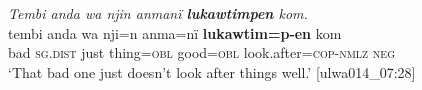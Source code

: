 \ea%
    \label{ex:loss:30}
          \textit{Tembi anda wa njin anmanï \textbf{lukawtimpen} kom.}\\
\gll    tembi  anda    wa    nji=n    anma=nï  \textbf{lukawtim=p-en} kom\\
    bad    \textsc{sg.dist}  just    thing=\textsc{obl}  good=\textsc{obl}  look.after=\textsc{cop-nmlz}    \textsc{neg}\\
\glt `That bad one just doesn’t look after things well.’ [ulwa014\_07:28]
\z


